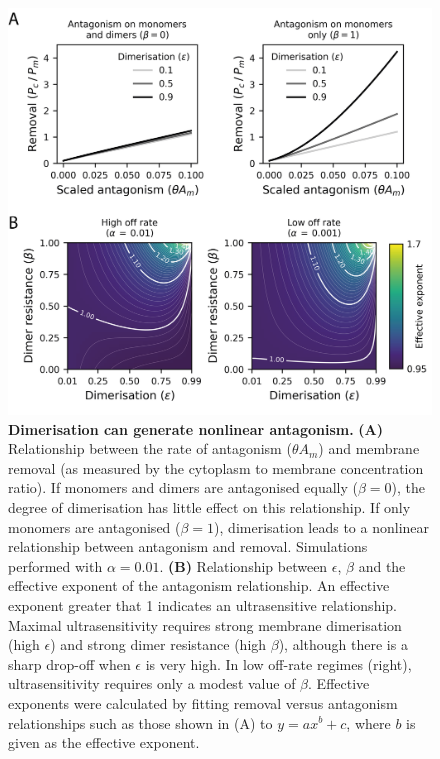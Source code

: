 \documentclass[12pt]{"report"}
\newcommand{\mycaption}[2]{\caption[#1]{\textbf{#1.} #2}}
\begin{document}
\begin{figure}
\includegraphics[scale=1]{model_antagonism_effective_exponent}
\centering
\mycaption{Dimerisation can generate nonlinear antagonism}{
\textbf{(A)} Relationship between the rate of antagonism ($\theta A_m$) and membrane removal (as measured by the cytoplasm to membrane concentration ratio). If monomers and dimers are antagonised equally ($\beta = 0$), the degree of dimerisation has little effect on this relationship. If only monomers are antagonised ($\beta = 1$), dimerisation leads to a nonlinear relationship between antagonism and removal. Simulations performed with $\alpha = 0.01$.
\textbf{(B)} Relationship between $\epsilon$, $\beta$ and the effective exponent of the antagonism relationship. An effective exponent greater that 1 indicates an ultrasensitive relationship. Maximal ultrasensitivity requires strong membrane dimerisation (high $\epsilon$) and strong dimer resistance (high $\beta$), although there is a sharp drop-off when $\epsilon$ is very high. In low off-rate regimes (right), ultrasensitivity requires only a modest value of $\beta$. Effective exponents were calculated by fitting removal versus antagonism relationships such as those shown in (A) to $y = a x^b + c$, where $b$ is given as the effective exponent.
}
\label{fig:model_antagonism_effective_exponent}
\end{figure}
\end{document}
